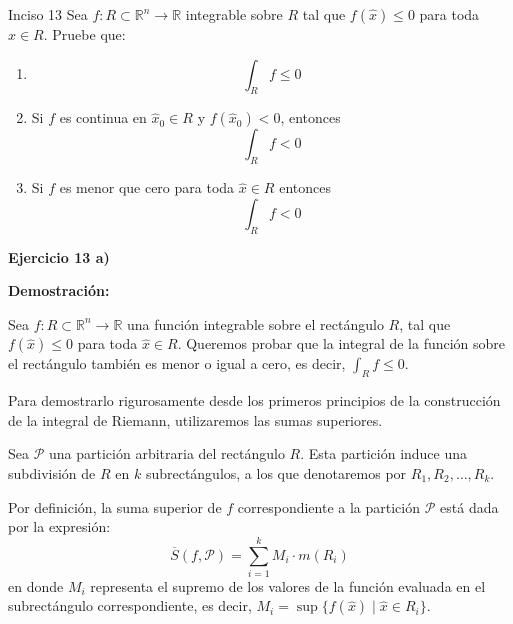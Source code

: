 \documentclass[11pt,letterpaper]{article}
\begin{document}
\begin{inciso}{Inciso 13}
Sea $f:R\subset\mathbb{R}^{n}\rightarrow\mathbb{R}$ integrable sobre $R$ tal que $f(\hat{x})\le 0$ para toda $\hat{x}\in R$. Pruebe que:
\begin{enumerate}[label=\alph*)]
    \item 
    \begin{equation*}
        \int_{R}f\le 0
    \end{equation*}
    \item Si $f$ es continua en $\hat{x}_{0}\in R$ y $f(\hat{x}_{0})<0$, entonces
    \begin{equation*}
        \int_{R}f<0
    \end{equation*}
    \item Si $f$ es menor que cero para toda $\hat{x}\in R$ entonces
    \begin{equation*}
        \int_{R}f<0
    \end{equation*}
\end{enumerate}
\end{inciso}

\textbf{Ejercicio 13 a)}

\textbf{Demostración:}

Sea $f: R \subset \mathbb{R}^n \rightarrow \mathbb{R}$ una función integrable sobre el rectángulo $R$, tal que $f(\hat{x}) \le 0$ para toda $\hat{x} \in R$. Queremos probar que la integral de la función sobre el rectángulo también es menor o igual a cero, es decir, $\int_R f \le 0$.

Para demostrarlo rigurosamente desde los primeros principios de la construcción de la integral de Riemann, utilizaremos las sumas superiores.

Sea $\mathcal{P}$ una partición arbitraria del rectángulo $R$. Esta partición induce una subdivisión de $R$ en $k$ subrectángulos, a los que denotaremos por $R_1, R_2, \dots, R_k$. 

Por definición, la suma superior de $f$ correspondiente a la partición $\mathcal{P}$ está dada por la expresión:
\begin{equation*}
\overline{S}(f, \mathcal{P}) = \sum_{i=1}^{k} M_i \cdot m(R_i)
\end{equation*}
en donde $M_i$ representa el supremo de los valores de la función evaluada en el subrectángulo correspondiente, es decir, $M_i = \sup \{ f(\hat{x}) \mid \hat{x} \in R_i \}$.
\end{document}

